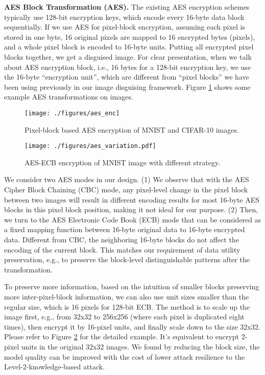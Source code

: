 \documentclass[conference]{IEEEtran}
\begin{document}
\textbf{AES Block Transformation (AES).} The existing AES encryption schemes typically use 128-bit encryption keys, which encode every 16-byte data block sequentially. If we use AES for pixel-block encryption, assuming each pixel is stored in one byte, 16 original pixels are mapped to 16 encrypted bytes (pixels), and a whole pixel block is encoded to 16-byte units. Putting all encrypted pixel blocks together, we get a disguised image. For clear presentation, when we talk about AES encryption block, i.e., 16 bytes for a 128-bit encryption key, we use the 16-byte ``encryption unit'', which are different from ``pixel blocks'' we have been using previously in our image disguising framework. Figure \ref{fig:aes_enc} shows some example AES transformations on images.

\begin{figure}[h]
  \centering
  \texttt{[image: ./figures/aes\_enc]}
   \caption{Pixel-block based AES encryption of MNIST and CIFAR-10 images. }
  
  \label{fig:aes_enc}
\end{figure}

\begin{figure}[h]
  \centering
  \texttt{[image: ./figures/aes\_variation.pdf]}
  \caption{AES-ECB encryption of MNIST image with different strategy. }
  \label{fig:aes_variation}
\end{figure}


We consider two AES modes in our design. (1) We observe that with the AES Cipher Block Chaining (CBC) mode, any pixel-level change in the pixel block between two images will result in different encoding results for most 16-byte AES blocks in this pixel block position, making it not ideal for our purpose.
(2) Then, we turn to the AES Electronic Code Book (ECB) mode that can be considered as a fixed mapping function between 16-byte original data to 16-byte encrypted data. Different from CBC, the neighboring 16-byte blocks do not affect the encoding of the current block. This matches our requirement of data utility preservation, e.g., to preserve the block-level distinguishable patterns after the transformation. 

To preserve more information, based on the intuition of smaller blocks preserving more inter-pixel-block information, we can also use unit sizes smaller than the regular size, which is 16 pixels for 128-bit ECB. The method is to scale up the image first, e.g., from 32x32 to 256x256 (where each pixel is duplicated eight times), then encrypt it by 16-pixel units, and finally scale down to the size 32x32. Please refer to Figure \ref{fig:aes_variation} for the detailed example. It's equivalent to encrypt 2-pixel units in the original 32x32 images. We found by reducing the block size, the model quality can be improved with the cost of lower attack resilience to the Level-2-knowledge-based attack. 
\end{document}
